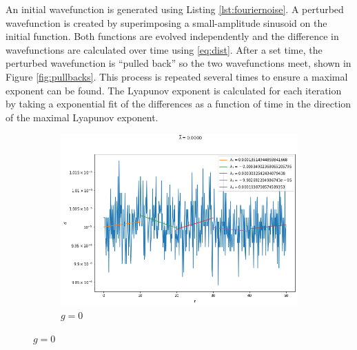	An initial wavefunction is generated using Listing \ref{lst:fouriernoise}. A perturbed wavefunction is created by superimposing a small-amplitude sinusoid on the initial function. Both functions are evolved independently and the difference in wavefunctions are calculated over time using \eqref{eq:dist}. After a set time, the perturbed wavefunction is ``pulled back'' so the two wavefunctions meet, shown in Figure \ref{fig:pullbacks}. This process is repeated several times to ensure a maximal exponent can be found. The Lyapunov exponent is calculated for each iteration by taking a exponential fit of the differences as a function of time in the direction of the maximal Lyapunov exponent. 


	\begin{figure}[p]
		\centering
		 \begin{subfigure}[b]{0.75\textwidth}
			\centering
			\includegraphics[width=\linewidth]{chapter3/pullbacks0}
			\caption{$g=0$}
			\label{fig:pullbacks0}
		\end{subfigure}
		
			\vspace{2em}
			

\end{figure}
